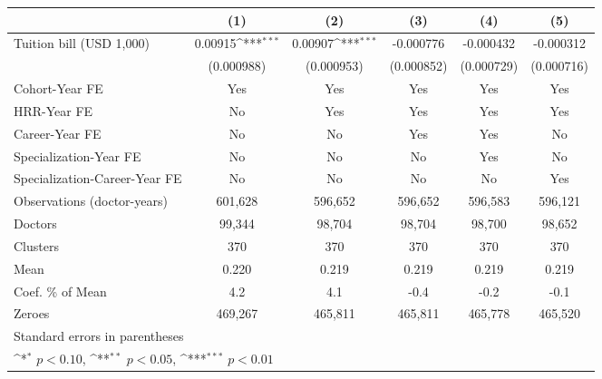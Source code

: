 {
\def\sym#1{\ifmmode^{#1}\else\(^{#1}\)\fi}
\begin{tabular}{l*{5}{c}}
\hline\hline
                    &\multicolumn{1}{c}{(1)}         &\multicolumn{1}{c}{(2)}         &\multicolumn{1}{c}{(3)}         &\multicolumn{1}{c}{(4)}         &\multicolumn{1}{c}{(5)}         \\
\hline
Tuition bill (USD 1,000)&     0.00915\sym{***}&     0.00907\sym{***}&   -0.000776         &   -0.000432         &   -0.000312         \\
                    &  (0.000988)         &  (0.000953)         &  (0.000852)         &  (0.000729)         &  (0.000716)         \\
[1em]
Cohort-Year FE      &         Yes         &         Yes         &         Yes         &         Yes         &         Yes         \\
[1em]
HRR-Year FE         &          No         &         Yes         &         Yes         &         Yes         &         Yes         \\
[1em]
Career-Year FE      &          No         &          No         &         Yes         &         Yes         &          No         \\
[1em]
Specialization-Year FE&          No         &          No         &          No         &         Yes         &          No         \\
[1em]
Specialization-Career-Year FE&          No         &          No         &          No         &          No         &         Yes         \\
\hline
Observations (doctor-years)&     601,628         &     596,652         &     596,652         &     596,583         &     596,121         \\
Doctors             &      99,344         &      98,704         &      98,704         &      98,700         &      98,652         \\
Clusters            &         370         &         370         &         370         &         370         &         370         \\
Mean                &       0.220         &       0.219         &       0.219         &       0.219         &       0.219         \\
Coef. \% of Mean    &         4.2         &         4.1         &        -0.4         &        -0.2         &        -0.1         \\
Zeroes              &     469,267         &     465,811         &     465,811         &     465,778         &     465,520         \\
\hline\hline
\multicolumn{6}{l}{\footnotesize Standard errors in parentheses}\\
\multicolumn{6}{l}{\footnotesize \sym{*} \(p<0.10\), \sym{**} \(p<0.05\), \sym{***} \(p<0.01\)}\\
\end{tabular}
}
